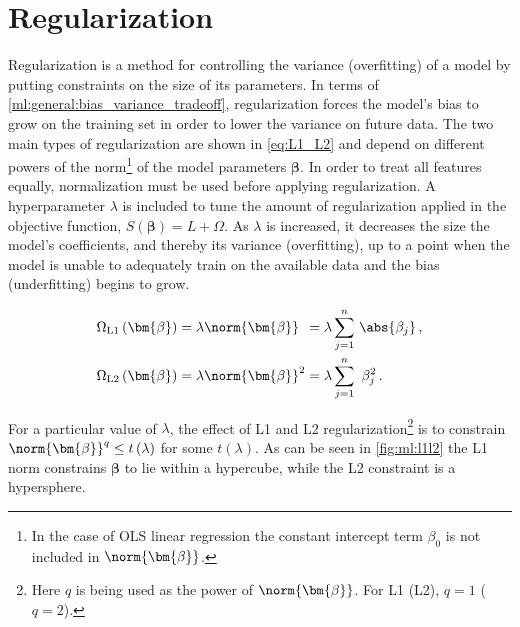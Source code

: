 \clearpage%
\section{Regularization}
\label{ml:general:reg}

Regularization is a method for controlling the variance (overfitting)
of a model by putting constraints on the size of its parameters.
In terms of \cref{ml:general:bias_variance_tradeoff}, regularization forces the model's
bias to grow on the training set in order to lower the variance on future data.
The two main types of regularization are shown in \cref{eq:L1_L2}
and depend on different powers of the norm\footnote{In
the case of OLS linear regression the constant intercept term $\beta_{0}$ is not included in $\norm{\bm{\beta}}$.} of the model parameters $\bm{\beta}$.
In order to treat all features equally, normalization must be used before applying regularization.
A hyperparameter $\lambda$ is included to tune the amount of regularization applied in the objective function,
$S\left(\bm{\beta}\right) = L + \Omega$.
As $\lambda$ is increased, it decreases the size the model's coefficients, and thereby its variance (overfitting),
up to a point when the model is unable to adequately train on the available data and the bias (underfitting) begins to grow.

\begin{subequations} \label{eq:L1_L2}
\begin{align}
\Omega_{\text{L1}}\left(\bm{\beta}\right) &= \lambda \norm{\bm{\beta}}\hphantom{^{1}}
= \lambda \sum_{j=1}^{n} \, \abs{\beta_{j}}\,, \label{eq:L1} \\
\Omega_{\text{L2}}\left(\bm{\beta}\right) &= \lambda \norm{\bm{\beta}}^{2}
= \lambda \sum_{j=1}^{n} \,\, \beta_{j}^{2}\,. \label{eq:L2}
\end{align}
\end{subequations}

For a particular value of $\lambda$, the effect of L1 and L2 regularization\footnote{Here
$q$ is being used as the power of $\norm{\bm{\beta}}$. For L1 (L2), $q=1$ ($q=2$).} is
to constrain $\norm{\bm{\beta}}^{q} \leq t\left(\lambda\right)$ for some $t\left(\lambda\right)$.
As can be seen in \cref{fig:ml:l1l2} the L1 norm constrains $\bm{\beta}$ to lie within a hypercube,
while the L2 constraint is a hypersphere.

